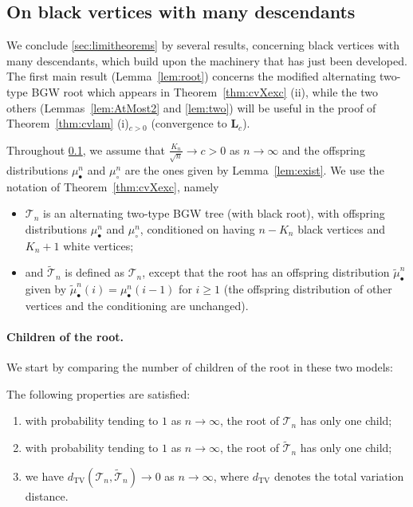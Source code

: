 \documentclass[AHL,XML,longabstracts,Unicode]{cedram}
\def\mub{\mu_{\bullet}}
\def\muc{\mu_{\circ}}
\def\mubn{\mu_{\bullet}^{n}}
\def\mucn{\mu_{\circ}^{n}}
\def\Ts{\mathscr{T}}
\begin{document}
\subsection{On black vertices with many descendants}
\label{ss:descendants}
We conclude \cref{sec:limitheorems} by several results, concerning black vertices with many descendants, which build upon the machinery that has just been developed. The first main result (Lemma~\ref{lem:root}) concerns the modified alternating two-type BGW root which appears in Theorem~\ref{thm:cvXexc} (ii), while the two others (Lemmas~\ref{lem:AtMost2} and \ref{lem:two}) will be useful in the proof of Theorem~\ref{thm:cvlam} (i)$_{c>0}$ (convergence to $\mathbf{L}_{c}$).

Throughout \cref{ss:descendants}, we assume that $ \tfrac{K_{n}}{\sqrt{n}} \rightarrow c>0$ as $n \rightarrow \infty$
and the offspring distributions $\mubn$ and $\mucn$ are the ones given by Lemma~\ref{lem:exist}.
We use the notation of Theorem~\ref{thm:cvXexc}, namely
\begin{itemize}
  \item $\Ts_{n}$ is  an alternating two-type BGW tree (with black root), with offspring distributions $\mub^{n}$ and $\muc^{n}$,
    conditioned on having $n-K_{n}$ black vertices and $K_{n}+1$ white vertices;
  \item  and  $\tilde{\Ts}_{n}$ is defined as $\Ts_{n}$,
     except that the root has an offspring distribution $\widetilde{\mu}^{n}_{\bullet}$
     given by $\widetilde{\mu}^{n}_{\bullet}(i)=\mubn(i-1)$ for $i \geq 1$
     (the offspring distribution of other vertices and the conditioning are unchanged).
\end{itemize}

\paragraph*{Children of the root.}
We start by comparing the number of children of the root in these two models:
\begin{lemma}\label{lem:root}
The following properties are satisfied:
\begin{enumerate}
\item[(i)] with probability tending to $1$ as $n \rightarrow \infty$, the root of $\Ts_{n}$ has only one child;
\item[(ii)] with probability tending to $1$ as $n \rightarrow \infty$, the root of $\tilde{\Ts}_{n}$ has only one child;
\item[(iii)] we have $d_{\mathrm{TV}}(\Ts_{n},\tilde{\Ts}_{n}) \rightarrow 0$ as $n \rightarrow \infty$, where $d_{\mathrm{TV}}$ denotes the total variation distance.
\end{enumerate}
\end{lemma}
\end{document}

